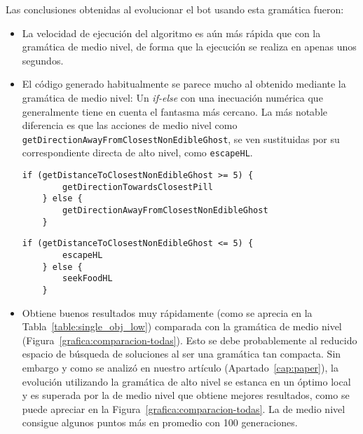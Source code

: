 Las conclusiones obtenidas al evolucionar el bot usando esta gramática fueron:
\begin{itemize}
\item La velocidad de ejecución del algoritmo es aún más rápida que con la gramática de medio nivel, de forma que la ejecución se realiza en apenas unos segundos.

\item El código generado habitualmente se parece mucho al obtenido mediante la gramática de medio nivel: Un \textit{if-else} con una inecuación numérica que generalmente tiene en cuenta el fantasma más cercano. La más notable diferencia es que las acciones de medio nivel como \texttt{getDirectionAwayFromClosestNonEdibleGhost}, se ven sustituidas por su correspondiente directa de alto nivel, como \texttt{escapeHL}.
\begin{lstlisting}[caption={Código del mejor individuo obtenido en una población evolucionada con la gramática de medio nivel.}]
    if (getDistanceToClosestNonEdibleGhost >= 5) {
        getDirectionTowardsClosestPill
    } else {
        getDirectionAwayFromClosestNonEdibleGhost
    }
\end{lstlisting}

\begin{lstlisting}[caption={Código del mejor individuo obtenido en una población evolucionada con la gramática de alto nivel.}]
    if (getDistanceToClosestNonEdibleGhost <= 5) {
        escapeHL
    } else {
        seekFoodHL
    }
\end{lstlisting}

\item Obtiene buenos resultados muy rápidamente (como se aprecia en la Tabla~\ref{table:single_obj_low}) comparada con la gramática de medio nivel (Figura~\ref{grafica:comparacion-todas}). Esto se debe probablemente al reducido espacio de búsqueda de soluciones al ser una gramática tan compacta. Sin embargo y como se analizó en nuestro artículo (Apartado~\ref{cap:paper}),  la evolución utilizando la gramática de alto nivel se estanca en un óptimo local y es superada por la de medio nivel que obtiene mejores resultados, como se puede apreciar en la Figura~\ref{grafica:comparacion-todas}. La de medio nivel consigue algunos puntos más en promedio con 100 generaciones.
\end{itemize}

